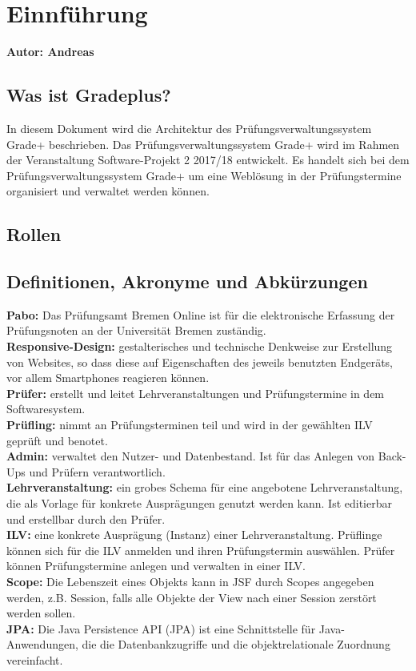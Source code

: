 
\section{Einnführung} \label{sec:einführung}

\textbf{Autor: Andreas}\\
\subsection{Was ist Gradeplus?} %


{  In diesem Dokument wird die Architektur des Prüfungsverwaltungssystem \glqq{}Grade+\grqq{} 
beschrieben. Das Prüfungsverwaltungssystem \glqq{}Grade+\grqq{}  wird im Rahmen der Veranstaltung Software-Projekt 2 2017/18 entwickelt. Es handelt sich bei dem Prüfungsverwaltungssystem \glqq{}Grade+\grqq{}  um eine Weblösung in der Prüfungstermine organisiert und verwaltet werden können.  \\
}

\subsection{Rollen}
%

\subsection{Definitionen, Akronyme und Abkürzungen}
{ 
\textbf{Pabo:}  Das Prüfungsamt Bremen Online ist für die elektronische Erfassung der Prüfungsnoten an der Universität Bremen zuständig.\\
\textbf{Responsive-Design:}  gestalterisches und technische Denkweise zur Erstellung von Websites, so dass diese auf Eigenschaften des jeweils benutzten Endgeräts, vor allem Smartphones reagieren können.\\
\textbf{Prüfer:} erstellt und leitet Lehrveranstaltungen und Prüfungstermine in dem Softwaresystem. \\ 
\textbf{Prüfling:} nimmt an Prüfungsterminen teil und wird in der gewählten ILV geprüft und benotet. \\ 
\textbf{Admin:} verwaltet den Nutzer- und Datenbestand. Ist für das Anlegen von Back-Ups und Prüfern verantwortlich. \\
\textbf{Lehrveranstaltung:} ein grobes Schema für eine angebotene Lehrveranstaltung, die als Vorlage für konkrete Ausprägungen genutzt werden kann. Ist editierbar und erstellbar durch den Prüfer. \\
\textbf{ILV:} eine konkrete Ausprägung (Instanz) einer Lehrveranstaltung. Prüflinge können sich für die ILV anmelden und ihren Prüfungstermin auswählen. Prüfer können Prüfungstermine anlegen und verwalten in einer ILV. \\
\textbf{Scope:} Die Lebenszeit eines Objekts kann in JSF durch Scopes angegeben werden, z.B. Session, falls alle Objekte der View nach einer Session zerstört werden sollen.\\
\textbf{JPA:} Die Java Persistence API (JPA) ist eine Schnittstelle für Java-Anwendungen, die die Datenbankzugriffe und die objektrelationale Zuordnung vereinfacht.
}

